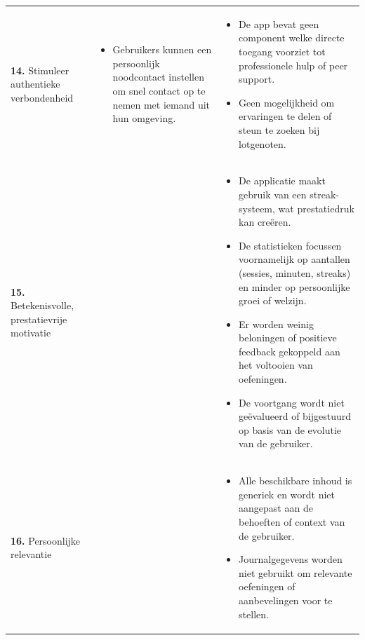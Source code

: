 {\begin{longtable}{
            >{\raggedright\arraybackslash}p{5.23cm}
            >{\raggedright\arraybackslash}p{4.93cm}
            >{\raggedright\arraybackslash}p{4.93cm}
        }
        \addlinespace[5pt]
        
        \textbf{14.} Stimuleer authentieke verbondenheid
        & 
        \begin{itemize}[nosep,leftmargin=*,itemsep=10pt]
            \renewcommand{\labelitemi}{+}
            \item Gebruikers kunnen een persoonlijk noodcontact instellen om snel contact op te nemen met iemand uit hun omgeving.
        \end{itemize}
        & 
        \begin{itemize}[nosep,leftmargin=*,itemsep=10pt]
            \renewcommand{\labelitemi}{-}
            \item De app bevat geen component welke directe toegang voorziet tot professionele hulp of peer support.
            \item Geen mogelijkheid om ervaringen te delen of steun te zoeken bij lotgenoten.
        \end{itemize}
        \\
        
        \addlinespace[5pt]
        
        \textbf{15.} Betekenisvolle, prestatievrije motivatie
        &
        & 
        \begin{itemize}[nosep,leftmargin=*,itemsep=10pt]
            \renewcommand{\labelitemi}{-}
            \item De applicatie maakt gebruik van een streak-systeem, wat prestatiedruk kan creëren.
            \item De statistieken focussen voornamelijk op aantallen (sessies, minuten, streaks) en minder op persoonlijke groei of welzijn.
            \item Er worden weinig beloningen of positieve feedback gekoppeld aan het voltooien van oefeningen.
            \item De voortgang wordt niet geëvalueerd of bijgestuurd op basis van de evolutie van de gebruiker.
        \end{itemize}
        \\
        
        \addlinespace[5pt]
        
        \textbf{16.} Persoonlijke relevantie
        &
        & 
        \begin{itemize}[nosep,leftmargin=*,itemsep=10pt]
            \renewcommand{\labelitemi}{-}
            \item Alle beschikbare inhoud is generiek en wordt niet aangepast aan de behoeften of context van de gebruiker.
            \item Journalgegevens worden niet gebruikt om relevante oefeningen of aanbevelingen voor te stellen.
        \end{itemize}
        \\
        

\end{longtable}}

